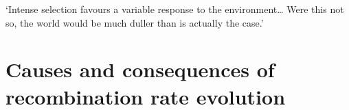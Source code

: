 \begin{savequote}[8cm]
‘Intense selection favours a variable response to the environment… Were this not so, the world would be much duller than is actually the case.’

\end{savequote}

\chapter{\label{ch:3-recombination-variation}Causes and consequences of recombination rate evolution} 

\minitoc{}

%
%
%



